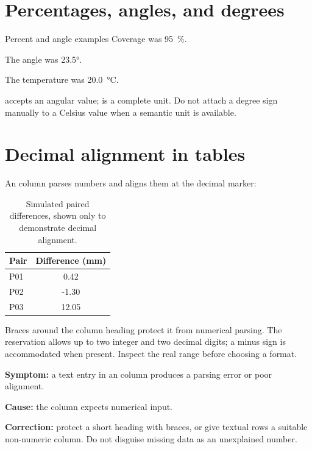\section{Percentages, angles, and degrees}

\begin{latexcode}{Percent and angle examples}
Coverage was \qty{95}{\percent}.

The angle was \ang{23.5}.

The temperature was \qty{20.0}{\degreeCelsius}.
\end{latexcode}

 accepts an angular value;  is a complete unit.
Do not attach a degree sign manually to a Celsius value when a semantic unit is
available.

\section{Decimal alignment in tables}

An  column parses numbers and aligns them at the decimal marker:

\begin{table}[htbp]
  \centering
  \caption{Simulated paired differences, shown only to demonstrate decimal
  alignment.}
  \label{tab:siunitx-alignment}
  \begin{tabular}{@{}lS[table-format=-2.2]@{}}
    \toprule
    Pair & {Difference (mm)} \\
    \midrule
    P01 & 0.42 \\
    P02 & -1.30 \\
    P03 & 12.05 \\
    \bottomrule
  \end{tabular}
\end{table}

Braces around the column heading protect it from numerical parsing. The
 reservation allows up to two integer and two decimal
digits; a minus sign is accommodated when present. Inspect the real range
before choosing a format.

\begin{commonerror}
\textbf{Symptom:} a text entry in an  column produces a parsing error
or poor alignment.

\textbf{Cause:} the column expects numerical input.

\textbf{Correction:} protect a short heading with braces, or give textual rows
a suitable non-numeric column. Do not disguise missing data as an unexplained
number.
\end{commonerror}

